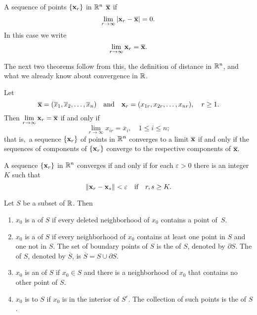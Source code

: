 \begin{definition}\label{thmtype:5.1.13}
A sequence of points $\{\mathbf{ x}_r\}$ in $  \mathbb{R}^n$
 $\overline{\mathbf{ x}}$ if
$$
\lim_{r\to\infty} |\mathbf{ x}_r-\overline{\mathbf{ x}}|=0.
$$
In this case we write
$$
\lim\limits_{r\to\infty}\mathbf{ x}_r=\overline{\mathbf{ x}}.
$$
\end{definition}



The next two theorems follow from this, the definition of
distance in $  \mathbb{R}^n$, and what we already know about convergence
in $  \mathbb{R}$. 
\begin{thm}\label{thmtype:5.1.14}
Let
$$
\overline{\mathbf{ x}}=(\overline{x}_1,\overline{x}_2,
\dots,\overline{x}_n)
\mbox{\quad and\quad}\mathbf{ x}_r=(x_{1r}, x_{2r}, \dots, x_{nr}),\quad
r\ge1.
$$
Then $\lim\limits_{r\to\infty}\mathbf{ x}_r=\overline{\mathbf{ x}}$ if and only if
$$
\lim\limits_{r\to\infty}x_{ir}=\overline{x}_i,\quad 1\le i\le n;
$$
that is$,$ a sequence $\{\mathbf{ x}_r\}$ of points in $  \mathbb{R}^n$
converges
to a limit $\overline{\mathbf{ x}}$ if and only if the sequences of
components of $\{\mathbf{ x}_r\}$ converge to the respective
components of
$\overline{\mathbf{ x}}.$
\end{thm}




\begin{thm} \label{thmtype:5.1.15}
A sequence $\{\mathbf{ x}_r\}$  in $  \mathbb{R}^n$ converges if and
only if for each $\varepsilon>0$ there is an integer $K$ such that
$$
{\left\|\mathbf{ x}_r-\mathbf{ x}_s\right\|}<\varepsilon\mbox{\quad if\quad} r,s\ge K.
$$
\end{thm}







\begin{df}\label{thmtype:1.3.4} Let $S$ be a subset of ${\mathbb{R}}$. Then
\begin{enumerate}
\item %
 $x_0$ is a 
of $S$ if every deleted neighborhood of $x_0$ contains a point of~$S$.


\item %
$x_0$ is a  of $S$ if every neighborhood
of $x_0$ contains at least one point in $S$ and one not in $S$. The set of
boundary points of $S$ is the  of $S$, denoted by $\partial
S$. The  of $S$, denoted by $\overline{S}$, is
$\overline{S}=S\cup \partial S$.


\item %
$x_0$ is an  of $S$ if $x_0\in S$
 and there is a neighborhood of $x_0$ that contains no other point of
$S$.

\item %
$x_0$ is  to $S$ if $x_0$ is in the interior of $S^c$. The
collection of such points is the  of $S$.
\end{enumerate}
\end{df}

